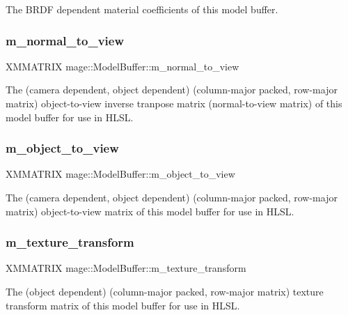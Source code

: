 The B\+R\+DF dependent material coefficients of this model buffer. \hypertarget{structmage_1_1_model_buffer_ae9cfca57417c88d28362d979d6d37fa8}{}\label{structmage_1_1_model_buffer_ae9cfca57417c88d28362d979d6d37fa8} 
\subsubsection{\texorpdfstring{m\+\_\+normal\+\_\+to\+\_\+view}{m\_normal\_to\_view}}
{\footnotesize\ttfamily X\+M\+M\+A\+T\+R\+IX mage\+::\+Model\+Buffer\+::m\+\_\+normal\+\_\+to\+\_\+view}

The (camera dependent, object dependent) (column-\/major packed, row-\/major matrix) object-\/to-\/view inverse tranpose matrix (normal-\/to-\/view matrix) of this model buffer for use in H\+L\+SL. \hypertarget{structmage_1_1_model_buffer_a2b4b94cd38c5d276aea4a7d6cc9edbba}{}\label{structmage_1_1_model_buffer_a2b4b94cd38c5d276aea4a7d6cc9edbba} 
\subsubsection{\texorpdfstring{m\+\_\+object\+\_\+to\+\_\+view}{m\_object\_to\_view}}
{\footnotesize\ttfamily X\+M\+M\+A\+T\+R\+IX mage\+::\+Model\+Buffer\+::m\+\_\+object\+\_\+to\+\_\+view}

The (camera dependent, object dependent) (column-\/major packed, row-\/major matrix) object-\/to-\/view matrix of this model buffer for use in H\+L\+SL. \hypertarget{structmage_1_1_model_buffer_a22d0996efc06c121ce2e0b88235d5650}{}\label{structmage_1_1_model_buffer_a22d0996efc06c121ce2e0b88235d5650} 
\subsubsection{\texorpdfstring{m\+\_\+texture\+\_\+transform}{m\_texture\_transform}}
{\footnotesize\ttfamily X\+M\+M\+A\+T\+R\+IX mage\+::\+Model\+Buffer\+::m\+\_\+texture\+\_\+transform}

The (object dependent) (column-\/major packed, row-\/major matrix) texture transform matrix of this model buffer for use in H\+L\+SL. 